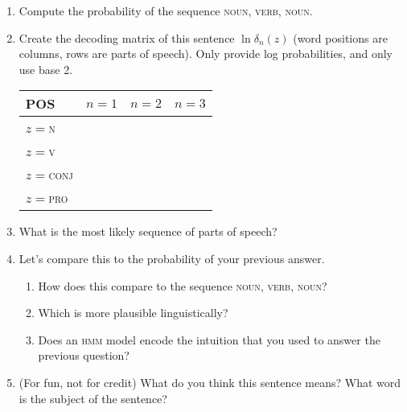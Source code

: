 \documentclass[11pt]{article}
\begin{document}
\begin{enumerate}

\item Compute the probability of the sequence \textsc{noun}, \textsc{verb}, \textsc{noun}.  

\item Create the decoding matrix of this sentence $\ln \delta_{n}(z)$ (word positions are columns, rows are parts of speech).  Only provide log probabilities, and only use base 2.

\begin{center}
\begin{tabular}{l|ccc}
	POS & $n=1$ & $n=2$ & $n=3$ \\
	\hline
	$z=$\textsc{n} & & & \\
	$z=$\textsc{v} & & & \\
	$z=$\textsc{conj} & & & \\	
	$z=$\textsc{pro} & & & \\	
	\hline
\end{tabular}
\end{center}

\item What is the most likely sequence of parts of speech?

\item Let's compare this to the probability of your previous answer.
	\begin{enumerate}
		\item How does this compare to the sequence \textsc{noun}, \textsc{verb}, \textsc{noun}?
		\item Which is more plausible linguistically?
		\item Does an \textsc{hmm} model encode the intuition that you used to answer the previous question?
	\end{enumerate}
\item (For fun, not for credit) What do you think this sentence means?  What word is the subject of the sentence?

\end{enumerate}
\end{document}
